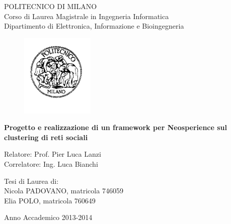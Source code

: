 \thispagestyle{empty}
\vspace*{-1.5cm} \bfseries{
\begin{center}
  \large
  POLITECNICO DI MILANO\\
  \normalsize
  Corso di Laurea Magistrale in Ingegneria Informatica\\
  Dipartimento di Elettronica, Informazione e Bioingegneria\\
  \begin{figure}[htbp]
    \begin{center}
      \includegraphics[width=3.5cm]{./pictures/logopm}
    \end{center}
  \end{figure}
  \vspace*{0.3cm} \LARGE



  \textbf{Progetto e realizzazione di un framework per Neosperience sul clustering di reti sociali}\\



\end{center}
\vspace*{3.0cm} \large
\begin{flushleft}


  Relatore: Prof. Pier Luca Lanzi \\
  Correlatore: Ing. Luca Bianchi

\end{flushleft}
\vspace*{1.0cm}
\begin{flushright}


  Tesi di Laurea di:\\ Nicola PADOVANO, matricola 746059 \\ 
		       Elia POLO, matricola 760649\\


\end{flushright}
\vspace*{0.5cm}
\begin{center}


\vfill
  Anno Accademico 2013-2014
\end{center} \clearpage
}
